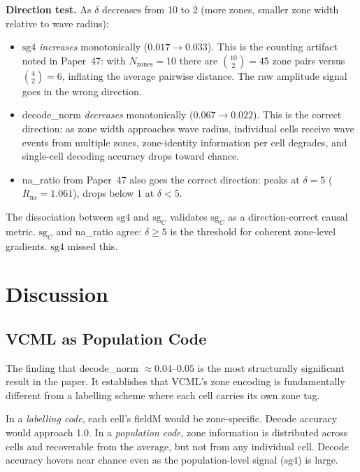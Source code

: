\documentclass[11pt,a4paper]{article}
\begin{document}
\textbf{Direction test.}  As $\delta$ decreases from 10 to 2 (more zones, smaller
zone width relative to wave radius):
\begin{itemize}
  \item $\mathrm{sg4}$ \emph{increases} monotonically ($0.017 \to 0.033$).
    This is the counting artifact noted in Paper~47: with $N_\text{zones}=10$
    there are $\binom{10}{2}=45$ zone pairs versus $\binom{4}{2}=6$, inflating
    the average pairwise distance.  The raw amplitude signal goes in the wrong
    direction.

  \item decode\_norm \emph{decreases} monotonically ($0.067 \to 0.022$).
    This is the correct direction: as zone width approaches wave radius,
    individual cells receive wave events from multiple zones, zone-identity
    information per cell degrades, and single-cell decoding accuracy drops
    toward chance.

  \item na\_ratio from Paper~47 also goes the correct direction: peaks at
    $\delta=5$ ($R_\text{na}=1.061$), drops below 1 at $\delta<5$.
\end{itemize}

The dissociation between $\mathrm{sg4}$ and $\mathrm{sg}_C$ validates
$\mathrm{sg}_C$ as a direction-correct causal metric.  $\mathrm{sg}_C$ and
na\_ratio agree: $\delta \geq 5$ is the threshold for coherent zone-level
gradients.  $\mathrm{sg4}$ missed this.

\section{Discussion}

\subsection{VCML as Population Code}

The finding that decode\_norm $\approx 0.04$--$0.05$ is the most structurally
significant result in the paper.  It establishes that VCML's zone encoding
is fundamentally different from a labelling scheme where each cell carries
its own zone tag.

In a \emph{labelling code}, each cell's fieldM would be zone-specific.
Decode accuracy would approach 1.0.  In a \emph{population code}, zone
information is distributed across cells and recoverable from the average,
but not from any individual cell.  Decode accuracy hovers near chance even
as the population-level signal ($\mathrm{sg4}$) is large.
\end{document}
